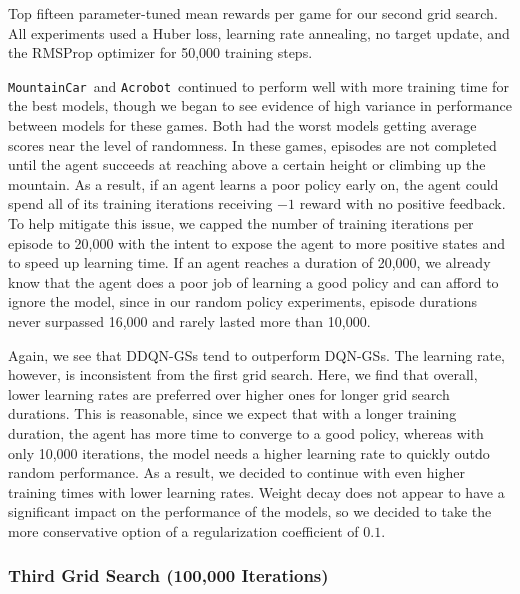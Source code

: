 \documentclass[11pt]{article}
\newcommand{\ab}{\texttt{Acrobot}}
\newcommand{\mc}{\texttt{MountainCar}}
\begin{document}
\begin{table}[!ht]
    \footnotesize
    \centering
    
    
    \caption{Top fifteen parameter-tuned mean rewards per game for our second grid search. All experiments used a Huber loss, learning rate annealing, no target update, and the RMSProp optimizer for 50,000 training steps.}
    \label{tab:grid_search_v2_50k}
\end{table}

\mc~and \ab~continued to perform well with more training time for the best models, though we began to see evidence of high variance in performance between models for these games. Both had the worst models getting average scores near the level of randomness. In these games, episodes are not completed until the agent succeeds at reaching above a certain height or climbing up the mountain. As a result, if an agent learns a poor policy early on, the agent could spend all of its training iterations receiving $-1$ reward with no positive feedback. To help mitigate this issue, we capped the number of training iterations per episode to 20,000 with the intent to expose the agent to more positive states and to speed up learning time. If an agent reaches a duration of 20,000, we already know that the agent does a poor job of learning a good policy and can afford to ignore the model, since in our random policy experiments, episode durations never surpassed 16,000 and rarely lasted more than 10,000.

Again, we see that DDQN-GSs tend to outperform DQN-GSs. The learning rate, however, is inconsistent from the first grid search. Here, we find that overall, lower learning rates are preferred over higher ones for longer grid search durations. This is reasonable, since we expect that with a longer training duration, the agent has more time to converge to a good policy, whereas with only 10,000 iterations, the model needs a higher learning rate to quickly outdo random performance. As a result, we decided to continue with even higher training times with lower learning rates. Weight decay does not appear to have a significant impact on the performance of the models, so we decided to take the more conservative option of a regularization coefficient of $0.1$.

\subsubsection{Third Grid Search (100,000 Iterations)}
\end{document}
